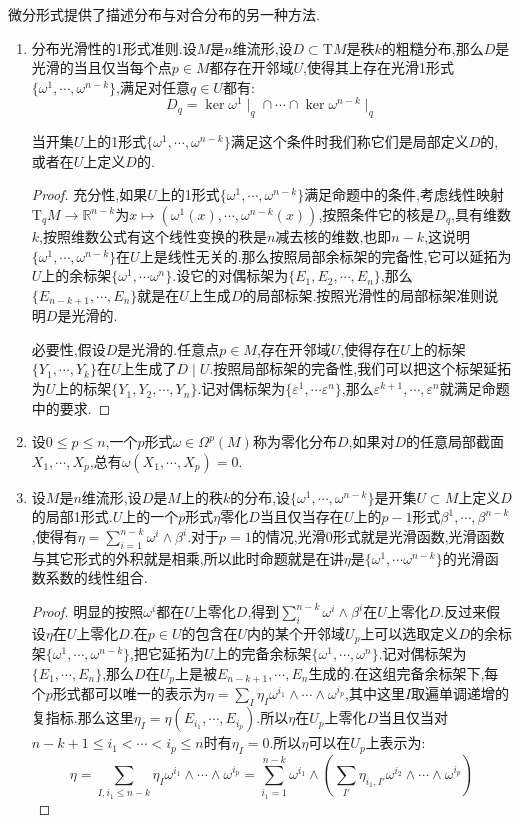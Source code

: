 微分形式提供了描述分布与对合分布的另一种方法.
\begin{enumerate}
	\item 分布光滑性的1形式准则.设$M$是$n$维流形,设$D\subset\mathrm{T}M$是秩$k$的粗糙分布,那么$D$是光滑的当且仅当每个点$p\in M$都存在开邻域$U$,使得其上存在光滑1形式$\{\omega^1,\cdots,\omega^{n-k}\}$,满足对任意$q\in U$都有:$$D_q=\ker\omega^1\mid_q\cap\cdots\cap\ker\omega^{n-k}\mid_q$$
	
	当开集$U$上的1形式$\{\omega^1,\cdots,\omega^{n-k}\}$满足这个条件时我们称它们是局部定义$D$的,或者在$U$上定义$D$的.
	\begin{proof}
		
		充分性,如果$U$上的1形式$\{\omega^1,\cdots,\omega^{n-k}\}$满足命题中的条件,考虑线性映射$\mathrm{T}_qM\to\mathbb{R}^{n-k}$为$x\mapsto(\omega^1(x),\cdots,\omega^{n-k}(x))$,按照条件它的核是$D_q$,具有维数$k$,按照维数公式有这个线性变换的秩是$n$减去核的维数,也即$n-k$,这说明$\{\omega^1,\cdots,\omega^{n-k}\}$在$U$上是线性无关的.那么按照局部余标架的完备性,它可以延拓为$U$上的余标架$\{\omega^1,\cdots\omega^n\}$.设它的对偶标架为$\{E_1,E_2,\cdots,E_n\}$,那么$\{E_{n-k+1},\cdots,E_n\}$就是在$U$上生成$D$的局部标架.按照光滑性的局部标架准则说明$D$是光滑的.
		
		必要性,假设$D$是光滑的.任意点$p\in M$,存在开邻域$U$,使得存在$U$上的标架$\{Y_1,\cdots,Y_k\}$在$U$上生成了$D\mid U$.按照局部标架的完备性,我们可以把这个标架延拓为$U$上的标架$\{Y_1,Y_2,\cdots,Y_n\}$.记对偶标架为$\{\varepsilon^1,\cdots\varepsilon^n\}$,那么$\varepsilon^{k+1},\cdots,\varepsilon^n$就满足命题中的要求.
	\end{proof}
    \item 设$0\le p\le n$,一个$p$形式$\omega\in\Omega^p(M)$称为零化分布$D$,如果对$D$的任意局部截面$X_1,\cdots,X_p$,总有$\omega(X_1,\cdots,X_p)=0$.
    \item 设$M$是$n$维流形,设$D$是$M$上的秩$k$的分布,设$\{\omega^1,\cdots,\omega^{n-k}\}$是开集$U\subset M$上定义$D$的局部1形式.$U$上的一个$p$形式$\eta$零化$D$当且仅当存在$U$上的$p-1$形式$\beta^1,\cdots,\beta^{n-k}$,使得有$\eta=\sum_{i=1}^{n-k}\omega^i\wedge\beta^i$.对于$p=1$的情况,光滑0形式就是光滑函数,光滑函数与其它形式的外积就是相乘,所以此时命题就是在讲$\eta$是$\{\omega^1,\cdots\omega^{n-k}\}$的光滑函数系数的线性组合.
    \begin{proof}
    	
    	明显的按照$\omega^i$都在$U$上零化$D$,得到$\sum_i^{n-k}\omega^i\wedge\beta^i$在$U$上零化$D$.反过来假设$\eta$在$U$上零化$D$.在$p\in U$的包含在$U$内的某个开邻域$U_p$上可以选取定义$D$的余标架$\{\omega^1,\cdots,\omega^{n-k}\}$,把它延拓为$U$上的完备余标架$\{\omega^1,\cdots,\omega^n\}$.记对偶标架为$\{E_1,\cdots,E_n\}$,那么$D$在$U_p$上是被$E_{n-k+1},\cdots,E_n$生成的.在这组完备余标架下,每个$p$形式都可以唯一的表示为$\eta=\sum_I\eta_I\omega^{i_1}\wedge\cdots\wedge\omega^{i_p}$,其中这里$I$取遍单调递增的复指标.那么这里$\eta_I=\eta(E_{i_1},\cdots,E_{i_p})$.所以$\eta$在$U_p$上零化$D$当且仅当对$n-k+1\le i_1<\cdots<i_p\le n$时有$\eta_I=0$.所以$\eta$可以在$U_p$上表示为:
    	$$\eta=\sum_{I,i_1\le n-k}\eta_I\omega^{i_1}\wedge\cdots\wedge\omega^{i_p}=\sum_{i_1=1}^{n-k}\omega^{i_1}\wedge\left(\sum_{I'}\eta_{i_1,I'}\omega^{i_2}\wedge\cdots\wedge\omega^{i_p}\right)$$
    	

\end{proof}
\end{enumerate}
